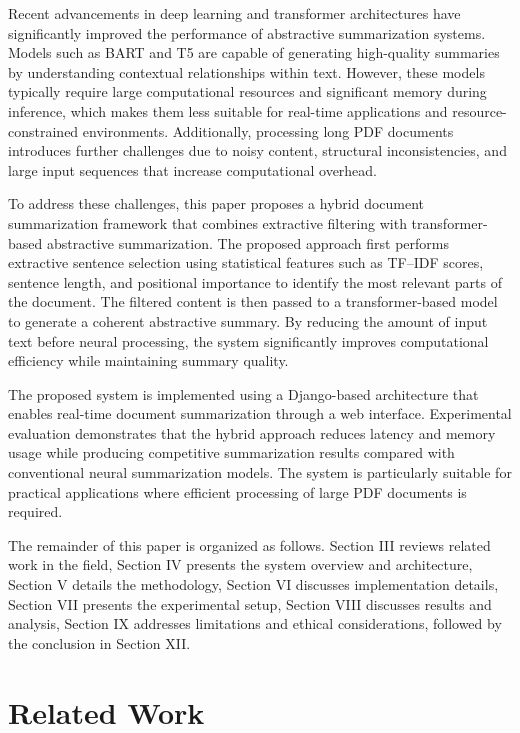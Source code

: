 \documentclass[conference]{IEEEtran}
\begin{document}
Recent advancements in deep learning and transformer architectures have significantly improved the performance of abstractive summarization systems. Models such as BART and T5 are capable of generating high-quality summaries by understanding contextual relationships within text. However, these models typically require large computational resources and significant memory during inference, which makes them less suitable for real-time applications and resource-constrained environments. Additionally, processing long PDF documents introduces further challenges due to noisy content, structural inconsistencies, and large input sequences that increase computational overhead.

To address these challenges, this paper proposes a hybrid document summarization framework that combines extractive filtering with transformer-based abstractive summarization. The proposed approach first performs extractive sentence selection using statistical features such as TF–IDF scores, sentence length, and positional importance to identify the most relevant parts of the document. The filtered content is then passed to a transformer-based model to generate a coherent abstractive summary. By reducing the amount of input text before neural processing, the system significantly improves computational efficiency while maintaining summary quality.

The proposed system is implemented using a Django-based architecture that enables real-time document summarization through a web interface. Experimental evaluation demonstrates that the hybrid approach reduces latency and memory usage while producing competitive summarization results compared with conventional neural summarization models. The system is particularly suitable for practical applications where efficient processing of large PDF documents is required.

The remainder of this paper is organized as follows. Section III reviews related work in the field, Section IV presents the system overview and architecture, Section V details the methodology, Section VI discusses implementation details, Section VII presents the experimental setup, Section VIII discusses results and analysis, Section IX addresses limitations and ethical considerations, followed by the conclusion in Section XII.

\section{Related Work}
\end{document}
